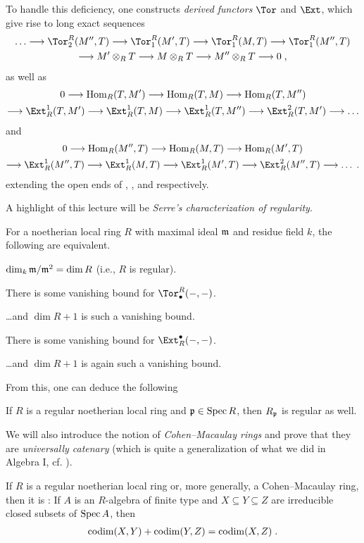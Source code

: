 \documentclass[a4paper,parskip=half,numbers=enddot, DIV=12]{scrreprt}
\begin{document}
To handle this deficiency, one constructs \emph{derived functors} $\Tor$ and $\Ext$, which give rise to long exact sequences
\begin{multline*}
	\ldots\morphism\Tor_2^R(M'',T)\morphism \Tor_1^R(M',T)\morphism \Tor_1^R(M,T)\morphism \Tor_1^R(M'',T)\\
	\morphism M'\otimes_RT\morphism M\otimes_RT\morphism M''\otimes_RT\morphism 0\;,
\end{multline*}
as well as
\begin{multline*}
	0\morphism\Hom_R(T,M')\morphism\Hom_R(T,M)\morphism\Hom_R(T,M'')\\
	\morphism\Ext_R^1(T,M')\morphism\Ext_R^1(T,M)\morphism\Ext_R^1(T,M'')\morphism\Ext_R^2(T,M')\morphism\ldots
\end{multline*}
and
\begin{multline*}
0\morphism\Hom_R(M'',T)\morphism\Hom_R(M,T)\morphism\Hom_R(M',T)\\
\morphism\Ext_R^1(M'',T)\morphism\Ext_R^1(M,T)\morphism\Ext_R^1(M',T)\morphism\Ext_R^2(M'',T)\morphism\ldots\;.
\end{multline*}
extending the open ends of , , and  respectively.

A highlight of this lecture will be \emph{Serre's characterization of regularity}.
\begin{thm*}
	For a  noetherian local ring $R$ with maximal ideal $\mathfrak{m}$ and residue field $k$, the following are equivalent.
	\begin{alphanumerate}
		\item $\dim_k\mathfrak{m}/\mathfrak{m}^2=\dim R$ (i.e., $R$ is regular).
		\item There is some vanishing bound for $\Tor_\bullet ^R(-,-)$.
		\item \ldots and $\dim R+1$ is such a vanishing bound.
		\item There is some vanishing bound for $\Ext_R^\bullet (-,-)$.
		\item \ldots and $\dim R+1$ is again such a vanishing bound.
	\end{alphanumerate}
\end{thm*}
From this, one can deduce the following
\begin{cor*}
	If $R$ is a regular noetherian local ring and $\mathfrak{p}\in\operatorname{Spec} R$, then $R_{\mathfrak{p}}$ is regular as well.
\end{cor*}

We will also introduce the notion of \emph{Cohen--Macaulay rings} and prove that they are \emph{universally catenary} (which is quite a generalization of what we did in Algebra I, cf. \cite[Theorem~10]{alg1}).
\begin{thm*}
	If $R$ is a regular noetherian local ring or, more generally, a Cohen--Macaulay ring, then it is : If $A$ is an $R$-algebra of finite type and $X\subseteq Y\subseteq Z$ are irreducible closed subsets of $\operatorname{Spec} A$, then
	\begin{align*}
		\operatorname{codim}(X,Y)+\operatorname{codim}(Y,Z)=\operatorname{codim}(X,Z)\;.
	\end{align*}
\end{thm*}
\end{document}
